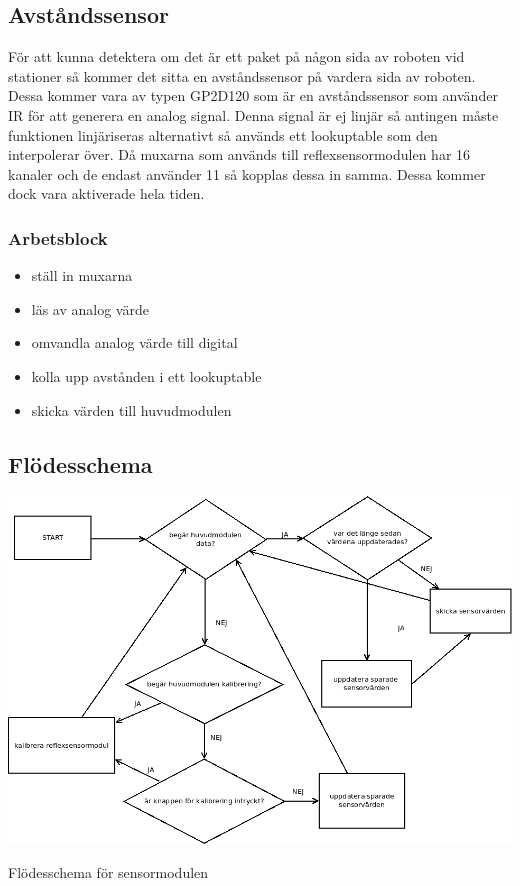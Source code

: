 \subsection{Avståndssensor}
För att kunna detektera om det är ett paket på någon sida av roboten vid stationer så kommer det sitta en avståndssensor på vardera sida av roboten. Dessa kommer vara av typen GP2D120 som är en avståndssensor som använder IR för att generera en analog signal. Denna signal är ej linjär så antingen måste funktionen linjäriseras alternativt så används ett lookuptable som den interpolerar över. Då muxarna som används till reflexsensormodulen har 16 kanaler och de endast använder 11 så kopplas dessa in samma. Dessa kommer dock vara aktiverade hela tiden.
\subsubsection{Arbetsblock}
\begin{itemize}
\item ställ in muxarna
\item läs av analog värde
\item omvandla analog värde till digital
\item kolla upp avstånden i ett lookuptable
\item skicka värden till huvudmodulen
\end{itemize}
\subsection{Flödesschema}
\centerline{\includegraphics[scale=0.4]{sensorflow}}
\centerline{Flödesschema för sensormodulen}
%